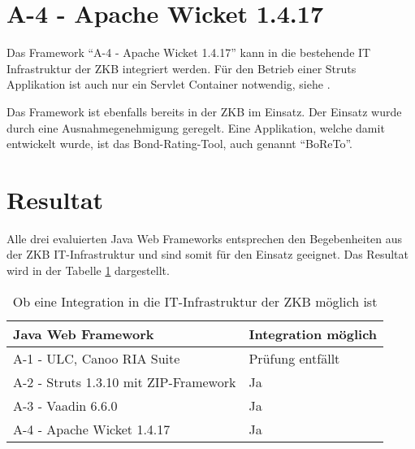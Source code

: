\section{A-4 - Apache Wicket 1.4.17}

Das Framework ``A-4 - Apache Wicket 1.4.17'' kann in die bestehende IT
Infrastruktur der \ac{ZKB} integriert werden. Für den Betrieb einer Struts
Applikation ist auch nur ein Servlet Container notwendig, siehe
\cite{WicketDokumentation}.

Das Framework ist ebenfalls bereits in der \ac{ZKB} im Einsatz. Der Einsatz
wurde durch eine Ausnahmegenehmigung geregelt. Eine Applikation, welche damit
entwickelt wurde, ist das Bond-Rating-Tool, auch genannt ``BoReTo''.

\section{Resultat}

Alle drei evaluierten Java Web Frameworks entsprechen den Begebenheiten aus der
\ac{ZKB} IT-Infrastruktur und sind somit für den Einsatz geeignet. Das Resultat
wird in der Tabelle \ref{tab:integrationMoeglich} dargestellt.
\newline

\begin{table}[!h]
  \sffamily 
  \begin{center}
    \begin{tabular}{ll}
      \toprule
      \textbf{Java Web Framework} & \textbf{Integration möglich}\\
      \midrule
      A-1 - ULC, Canoo RIA Suite & Prüfung entfällt\\
      A-2 - Struts 1.3.10 mit ZIP-Framework & Ja\\
      A-3 - Vaadin 6.6.0 & Ja\\
      A-4 - Apache Wicket 1.4.17 & Ja\\
      \bottomrule
    \end{tabular}
    \caption{Ob eine Integration in die IT-Infrastruktur der \ac{ZKB} möglich
    ist}
    \label{tab:integrationMoeglich}
  \end{center}
\end{table}